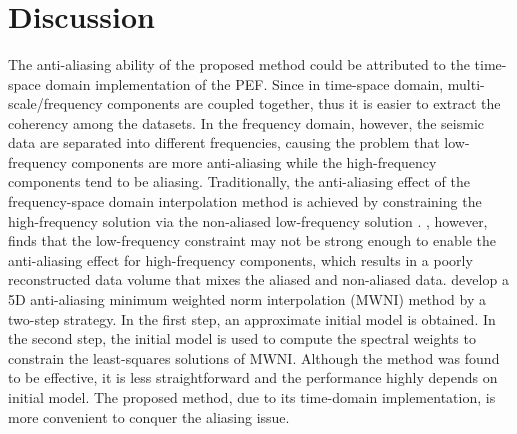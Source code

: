 {\begin{figure}[htb!]
   \centering
   \\
   \\
   \\
\caption{}
\label{fig:zerofk2d,reconfk2d2,reconfk2d}
\end{figure}
}

\section{Discussion}
The anti-aliasing ability of the proposed method could be attributed to the time-space domain implementation of the PEF. Since in time-space domain, multi-scale/frequency components are coupled together, thus it is easier to extract the coherency among the datasets. In the frequency domain, however, the seismic data are separated into different frequencies, causing the problem that low-frequency components are more anti-aliasing while the high-frequency components tend to be aliasing. Traditionally, the anti-aliasing effect of the frequency-space domain interpolation method is achieved by constraining the high-frequency solution via the non-aliased low-frequency solution \cite[]{herrmann2000aliased}. \cite{cary2011aliasing}, however, finds that the low-frequency constraint may not be strong enough to enable the anti-aliasing effect for high-frequency components, which results in a poorly reconstructed data volume that mixes the aliased and non-aliased data. \cite{chiu20135d} develop a 5D anti-aliasing minimum weighted norm interpolation (MWNI) method by a two-step strategy. In the first step, an approximate initial model is obtained. In the second step, the initial model is used to compute the spectral weights to constrain the least-squares solutions of MWNI. Although the method was found to be effective, it is less straightforward and the performance highly depends on initial model. The proposed method, due to its time-domain implementation, is more convenient to conquer the aliasing issue.

